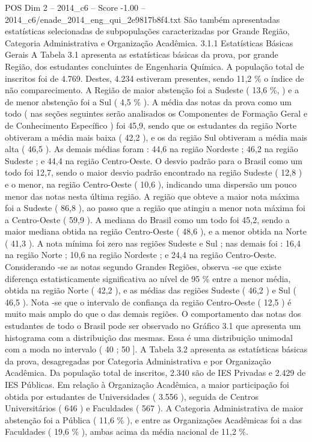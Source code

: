 \begin{textsample}{POS Dim 2 – 2014\_c6 – Score -1.00 – 2014\_c6/enade\_2014\_eng\_qui\_2e9817b8f4.txt}
São também apresentadas estatísticas selecionadas de subpopulações caracterizadas por Grande Região, Categoria Administrativa e Organização Acadêmica. 3.1.1 Estatísticas Básicas Gerais A Tabela 3.1 apresenta as estatísticas básicas da prova, por grande Região, dos estudantes concluintes de Engenharia Química.
A população total de inscritos foi de 4.769.
Destes, 4.234 estiveram presentes, sendo 11,2 \% o índice de não comparecimento.
A Região de maior abstenção foi a Sudeste ( 13,6 \%, ) e a de menor abstenção foi a Sul ( 4,5 \% ).
A média das notas da prova como um todo ( nas seções seguintes serão analisados os Componentes de Formação Geral e de Conhecimento Específico ) foi 45,9, sendo que os estudantes da região Norte obtiveram a média mais baixa ( 42,2 ), e os da região Sul obtiveram a média mais alta ( 46,5 ).
As demais médias foram : 44,6 na região Nordeste ; 46,2 na região Sudeste ; e 44,4 na região Centro-Oeste.
O desvio padrão para o Brasil como um todo foi 12,7, sendo o maior desvio padrão encontrado na região Sudeste ( 12,8 ) e o menor, na região Centro-Oeste ( 10,6 ), indicando uma dispersão um pouco menor das notas nesta última região.
A região que obteve a maior nota máxima foi a Sudeste ( 86,8 ), ao passo que a região que atingiu a menor nota máxima foi a Centro-Oeste ( 59,9 ).
A mediana do Brasil como um todo foi 45,2, sendo a maior mediana obtida na região Centro-Oeste ( 48,6 ), e a menor obtida na Norte ( 41,3 ).
A nota mínima foi zero nas regiões Sudeste e Sul ; nas demais foi : 16,4 na região Norte ; 10,6 na região Nordeste ; e 24,4 na região Centro-Oeste.
Considerando -se as notas segundo Grandes Regiões, observa -se que existe diferença estatisticamente significativa ao nível de 95 \% entre a menor média, obtida na região Norte ( 42,2 ), e as médias das regiões Sudeste ( 46,2 ) e Sul ( 46,5 ).
Nota -se que o intervalo de confiança da região Centro-Oeste ( 12,5 ) é muito mais amplo do que o das demais regiões.
O comportamento das notas dos estudantes de todo o Brasil pode ser observado no Gráfico 3.1 que apresenta um histograma com a distribuição das mesmas.
Essa é uma distribuição unimodal com a moda no intervalo ( 40 ; 50 ].
A Tabela 3.2 apresenta as estatísticas básicas da prova, desagregadas por Categoria Administrativa e por Organização Acadêmica.
Da população total de inscritos, 2.340 são de IES Privadas e 2.429 de IES Públicas.
Em relação à Organização Acadêmica, a maior participação foi obtida por estudantes de Universidades ( 3.556 ), seguida de Centros Universitários ( 646 ) e Faculdades ( 567 ).
A Categoria Administrativa de maior abstenção foi a Pública ( 11,6 \% ), e entre as Organizações Acadêmicas foi a das Faculdades ( 19,6 \% ), ambas acima da média nacional de 11,2 \%.

\end{textsample}
